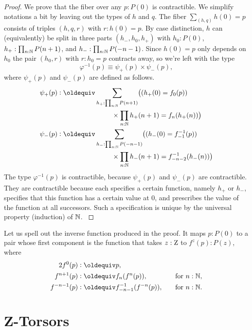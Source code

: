\documentclass[a4paper,12pt]{amsart}
\begin{document}
\begin{proof}
  We prove that the fiber over any $p : P(0)$ is contractible.
  We simplify notations a bit by leaving out the types of $h$ and $q$.
  The fiber $\sum_{(h,q)} h(0)=p$ consists of triples $(h,q,r)$ with $r : h(0) = p$.
  By case distinction, $h$ can (equivalently) be split in three parts $(h_-,h_0,h_+)$
  with $h_0 : P(0)$, $h_+ : \prod_{n:\mathbb{N}}P(n+1)$,  and $h_- : \prod_{n:\mathbb{N}} P(-n-1)$.
  Since $h(0)=p$ only depends on $h_0$ the pair $(h_0,r)$ with  $r : h_0 = p$
  contracts away, so we're left with the type
  $$ \varphi^{-1}(p) \equiv \psi_+(p) \times \psi_-(p), $$
  \bgroup
  where $\psi_+(p)$ and $\psi_-(p)$ are defined as follows.
  \begin{align*}
    \psi_+(p) & \defeq  \sum_{h_+ : \prod_{n:\NN}P(n+1)}  \bigl((h_+(0) = f_0(p))         \\
    & \hspace {8em} \times \prod_{n:\NN}h_+(n+1) = f_n(h_+(n))\bigr) \\
    \psi_-(p) & \defeq  \sum_{h_- : \prod_{n:\NN}P(-n-1)} \bigl((h_-(0) = f_{-1}^{-1}(p))  \\
    & \hspace {8em} \times \prod_{n:\NN}h_-(n+1) = f_{-n-2}^{-1}(h_-(n))\bigr)
  \end{align*}
  The type $\varphi^{-1}(p)$ is contractible, because $\psi_+(p)$ and $\psi_-(p)$ are contractible.
  They are contractible because each specifies a certain function, namely $h_+$ or $h_-$,
  specifies that this function has a certain value at $0$,
  and prescribes the value of the function at all successors.
  Such a specification is unique by the universal property (induction) of $\mathbb{N}$.
  \egroup
\end{proof}

Let us spell out the inverse function produced in the proof.
It maps $p : P(0)$ to a pair whose first component
is the function that takes $z:\mathrm{Z}$ to $f^z(p):P(z)$, where
\begin{alignat*}2
  f^0(p) &\defeq p, && \\
  f^{n+1}(p) &\defeq f_n(f^n(p)),&\quad&\text{for $n:\NN$,} \\
  f^{-n-1}(p) &\defeq f_{-n-1}^{-1}(f^{-n}(p)),&\quad&\text{for $n:\NN$.}
\end{alignat*}



\section{Z-Torsors}\label{sec:ZTorsors}
\end{document}
